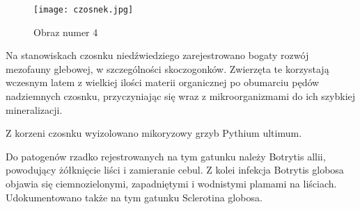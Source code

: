 \begin{figure}
 \centering
 \texttt{[image: czosnek.jpg]}
 \caption{Obraz numer 4}
 \label{Img1}
\end{figure}

Na stanowiskach czosnku niedźwiedziego zarejestrowano bogaty rozwój mezofauny glebowej, w szczególności skoczogonków. Zwierzęta te korzystają wczesnym latem z wielkiej ilości materii organicznej po obumarciu pędów nadziemnych czosnku, przyczyniając się wraz z mikroorganizmami do ich szybkiej mineralizacji.

Z korzeni czosnku wyizolowano mikoryzowy grzyb Pythium ultimum.

Do patogenów rzadko rejestrowanych na tym gatunku należy Botrytis allii, powodujący żółknięcie liści i zamieranie cebul. Z kolei infekcja Botrytis globosa objawia się ciemnozielonymi, zapadniętymi i
 wodnistymi plamami na liściach. Udokumentowano także na tym gatunku Sclerotina globosa.
